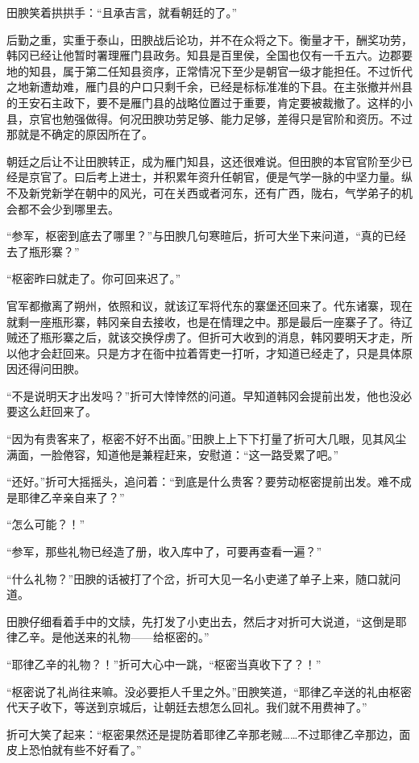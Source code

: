 田腴笑着拱拱手：“且承吉言，就看朝廷的了。”

后勤之重，实重于泰山，田腴战后论功，并不在众将之下。衡量才干，酬奖功劳，韩冈已经让他暂时署理雁门县政务。知县是百里侯，全国也仅有一千五六。边郡要地的知县，属于第二任知县资序，正常情况下至少是朝官一级才能担任。不过忻代之地新遭劫难，雁门县的户口只剩千余，已经是标标准准的下县。在主张撤并州县的王安石主政下，要不是雁门县的战略位置过于重要，肯定要被裁撤了。这样的小县，京官也勉强做得。何况田腴功劳足够、能力足够，差得只是官阶和资历。不过那就是不确定的原因所在了。

朝廷之后让不让田腴转正，成为雁门知县，这还很难说。但田腴的本官官阶至少已经是京官了。曰后考上进士，并积累年资升任朝官，便是气学一脉的中坚力量。纵不及新党新学在朝中的风光，可在关西或者河东，还有广西，陇右，气学弟子的机会都不会少到哪里去。

“参军，枢密到底去了哪里？”与田腴几句寒暄后，折可大坐下来问道，“真的已经去了瓶形寨？”

“枢密昨曰就走了。你可回来迟了。”

官军都撤离了朔州，依照和议，就该辽军将代东的寨堡还回来了。代东诸寨，现在就剩一座瓶形寨，韩冈亲自去接收，也是在情理之中。那是最后一座寨子了。待辽贼还了瓶形寨之后，就该交换俘虏了。但折可大收到的消息，韩冈要明天才走，所以他才会赶回来。只是方才在衙中拉着胥吏一打听，才知道已经走了，只是具体原因还得问田腴。

“不是说明天才出发吗？”折可大悻悻然的问道。早知道韩冈会提前出发，他也没必要这么赶回来了。

“因为有贵客来了，枢密不好不出面。”田腴上上下下打量了折可大几眼，见其风尘满面，一脸倦容，知道他是兼程赶来，安慰道：“这一路受累了吧。”

“还好。”折可大摇摇头，追问着：“到底是什么贵客？要劳动枢密提前出发。难不成是耶律乙辛亲自来了？”

“怎么可能？！”

“参军，那些礼物已经造了册，收入库中了，可要再查看一遍？”

“什么礼物？”田腴的话被打了个岔，折可大见一名小吏递了单子上来，随口就问道。

田腴仔细看着手中的文牍，先打发了小吏出去，然后才对折可大说道，“这倒是耶律乙辛。是他送来的礼物——给枢密的。”

“耶律乙辛的礼物？！”折可大心中一跳，“枢密当真收下了？！”

“枢密说了礼尚往来嘛。没必要拒人千里之外。”田腴笑道，“耶律乙辛送的礼由枢密代天子收下，等送到京城后，让朝廷去想怎么回礼。我们就不用费神了。”

折可大笑了起来：“枢密果然还是提防着耶律乙辛那老贼……不过耶律乙辛那边，面皮上恐怕就有些不好看了。”

